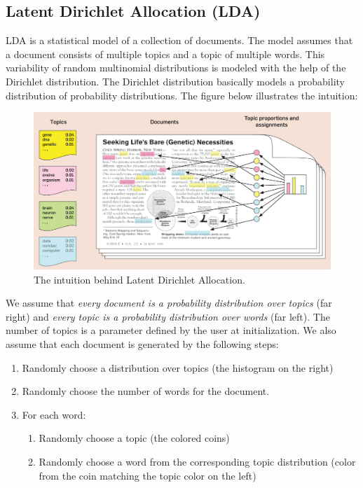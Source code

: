 \subsection{Latent Dirichlet Allocation (LDA)}
LDA \cite{blei2003latent} is a statistical model of a collection of documents. The model assumes that a document consists of multiple topics and a topic of multiple words. This variability of random multinomial distributions is modeled with the help of the Dirichlet distribution. The Dirichlet distribution basically models a probability distribution of probability distributions. The figure below illustrates the intuition:
\begin{figure}[H]
    \centering
    \includegraphics[width=1\textwidth]{figures/topicmodel}
    \caption{The intuition behind Latent Dirichlet Allocation. \cite{kim2019insider}}
\end{figure}
We assume that \textit{every document is a probability distribution over topics} (far right) and \textit{every topic is a probability distribution over words} (far left). The number of topics is a parameter defined by the user at initialization. 
We also assume that each document is generated by the following steps:
\begin{enumerate}
    \item Randomly choose a distribution over topics (the histogram on the right)
    \item Randomly choose the number of words for the document.
    \item For each word:
    \begin{enumerate}
        \item Randomly choose a topic (the colored coins)
        \item Randomly choose a word from the corresponding topic distribution (color from the coin matching the topic color on the left)
    \end{enumerate}
\end{enumerate}
